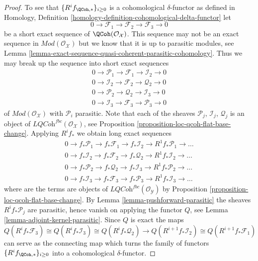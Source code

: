 \begin{proof}
\medskip\noindent
To see that $\{R^if_{\QCoh, *}\}_{i \geq 0}$ is a cohomological
$\delta$-functor as defined in
Homology, Definition \ref{homology-definition-cohomological-delta-functor}
let
$$
0 \to \mathcal{F}_1 \to \mathcal{F}_2 \to \mathcal{F}_3 \to 0
$$
be a short exact sequence of $\QCoh(\mathcal{O}_\mathcal{X})$.
This sequence may not be an exact sequence in
$\textit{Mod}(\mathcal{O}_\mathcal{X})$ but we know that it is
up to parasitic modules, see
Lemma \ref{lemma-exact-sequence-quasi-coherent-parasitic-cohomology}.
Thus we may break up the sequence into short exact sequences
$$
\begin{matrix}
0 \to \mathcal{P}_1 \to \mathcal{F}_1 \to \mathcal{I}_2 \to 0 \\
0 \to \mathcal{I}_2 \to \mathcal{F}_2 \to \mathcal{Q}_2 \to 0 \\
0 \to \mathcal{P}_2 \to \mathcal{Q}_2 \to \mathcal{I}_3 \to 0 \\
0 \to \mathcal{I}_3 \to \mathcal{F}_3 \to \mathcal{P}_3 \to 0
\end{matrix}
$$
of $\textit{Mod}(\mathcal{O}_\mathcal{X})$ with $\mathcal{P}_i$ parasitic.
Note that each of the sheaves
$\mathcal{P}_j$, $\mathcal{I}_j$, $\mathcal{Q}_j$ is an object of
$\textit{LQCoh}^{fbc}(\mathcal{O}_\mathcal{X})$, see
Proposition \ref{proposition-loc-qcoh-flat-base-change}.
Applying $R^if_*$ we obtain long exact sequences 
$$
\begin{matrix}
0 \to f_*\mathcal{P}_1 \to f_*\mathcal{F}_1 \to f_*\mathcal{I}_2 \to
R^1f_*\mathcal{P}_1 \to \ldots \\
0 \to f_*\mathcal{I}_2 \to f_*\mathcal{F}_2 \to f_*\mathcal{Q}_2 \to
R^1f_*\mathcal{I}_2 \to \ldots \\
0 \to f_*\mathcal{P}_2 \to f_*\mathcal{Q}_2 \to f_*\mathcal{I}_3 \to
R^1f_*\mathcal{P}_2 \to \ldots \\
0 \to f_*\mathcal{I}_3 \to f_*\mathcal{F}_3 \to f_*\mathcal{P}_3 \to
R^1f_*\mathcal{I}_3 \to \ldots
\end{matrix}
$$
where are the terms are objects of
$\textit{LQCoh}^{fbc}(\mathcal{O}_\mathcal{Y})$ by
Proposition \ref{proposition-loc-qcoh-flat-base-change}.
By
Lemma \ref{lemma-pushforward-parasitic}
the sheaves $R^if_*\mathcal{P}_j$ are parasitic, hence vanish on applying
the functor $Q$, see
Lemma \ref{lemma-adjoint-kernel-parasitic}.
Since $Q$ is exact the maps
$$
Q(R^if_*\mathcal{F}_3)
\cong
Q(R^if_*\mathcal{I}_3)
\cong
Q(R^if_*\mathcal{Q}_2)
\rightarrow
Q(R^{i + 1}f_*\mathcal{I}_2)
\cong
Q(R^{i + 1}f_*\mathcal{F}_1)
$$
can serve as the connecting map which turns the family of functors
$\{R^if_{\QCoh, *}\}_{i \geq 0}$
into a cohomological $\delta$-functor.
\end{proof}

